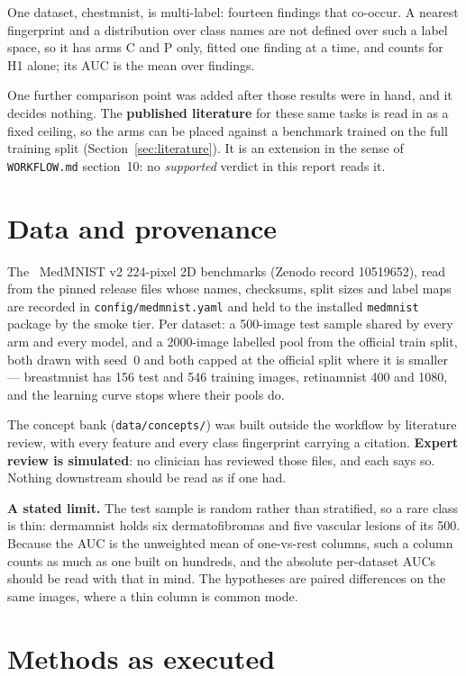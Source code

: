 \documentclass[11pt]{article}
\begin{document}
One dataset, chestmnist, is multi-label: fourteen findings that co-occur. A nearest fingerprint and
a distribution over class names are not defined over such a label space, so it has arms C and P
only, fitted one finding at a time, and counts for H1 alone; its AUC is the mean over findings.

One further comparison point was added after those results were in hand, and it decides nothing.
The \textbf{published literature} for these same tasks is read in as a fixed ceiling, so the
arms can be placed against a benchmark trained on the full training split
(Section~\ref{sec:literature}). It is an extension in the sense of \texttt{WORKFLOW.md}
section~10: no \emph{supported} verdict in this report reads it.

\section{Data and provenance}

The \numDatasets\ MedMNIST v2 224-pixel 2D benchmarks (Zenodo record 10519652), read from the
pinned release files whose names, checksums, split sizes and label maps are recorded in
\texttt{config/medmnist.yaml} and held to the installed \texttt{medmnist} package by the smoke
tier. Per dataset: a 500-image test sample shared by every arm and every model, and a 2000-image
labelled pool from the official train split, both drawn with seed~0 and both capped at the official
split where it is smaller --- breastmnist has 156 test and 546 training images, retinamnist 400 and
1080, and the learning curve stops where their pools do.

The concept bank (\texttt{data/concepts/}) was built outside the workflow by literature review,
with every feature and every class fingerprint carrying a citation. \textbf{Expert review is
simulated}: no clinician has reviewed those files, and each says so. Nothing downstream should be
read as if one had.

\textbf{A stated limit.} The test sample is random rather than stratified, so a rare class is thin:
dermamnist holds six dermatofibromas and five vascular lesions of its 500. Because the AUC is the
unweighted mean of one-vs-rest columns, such a column counts as much as one built on hundreds, and
the absolute per-dataset AUCs should be read with that in mind. The hypotheses are paired
differences on the same images, where a thin column is common mode.

\section{Methods as executed}
\end{document}
